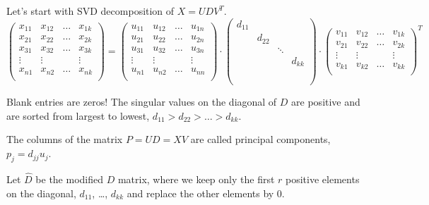 \documentclass[12pt]{article}
\begin{document}
Let's start with SVD decomposition of $X = UDV^T$.
\[
\begin{pmatrix}
    x_{11} & x_{12} & \dots & x_{1k} \\
    x_{21} & x_{22} & \dots & x_{2k} \\
    x_{31} & x_{32} & \dots & x_{3k} \\
    \vdots & \vdots &    & \vdots \\
    x_{n1} & x_{n2} & \dots & x_{nk} \\
\end{pmatrix} =
\begin{pmatrix}
    u_{11} & u_{12} & \dots & u_{1n} \\
    u_{21} & u_{22} & \dots & u_{2n} \\
    u_{31} & u_{32} & \dots & u_{3n} \\
    \vdots & \vdots &    & \vdots \\
    u_{n1} & u_{n2} & \dots & u_{nn} \\
\end{pmatrix} \cdot 
\begin{pmatrix}
    d_{11} &  &     &  \\
     & d_{22} &     &  \\
     &  & \ddots    &  \\
     &  &   &    d_{kk} \\
     &  &  &     \\
     &  &  &    \\
     &  &  &     \\
\end{pmatrix} \cdot
\begin{pmatrix}
    v_{11} & v_{12} & \dots & v_{1k} \\
    v_{21} & v_{22} & \dots & v_{2k} \\
    \vdots & \vdots &    & \vdots \\
    v_{k1} & v_{k2} & \dots & v_{kk} \\
\end{pmatrix}^T
\]

Blank entries are zeros! The singular values on the diagonal of $D$ are positive and are sorted from largest to lowest, $d_{11} > d_{22} > \dots > d_{kk}$.

The columns of the matrix $P = UD = XV$ are called principal components, $p_j = d_{jj} u_j$.

Let $\hat D$ be the modified $D$ matrix, where we keep only the first $r$ positive elements on the diagonal, $d_{11}$, \dots, $d_{kk}$ 
and replace the other elements by $0$.
\end{document}
